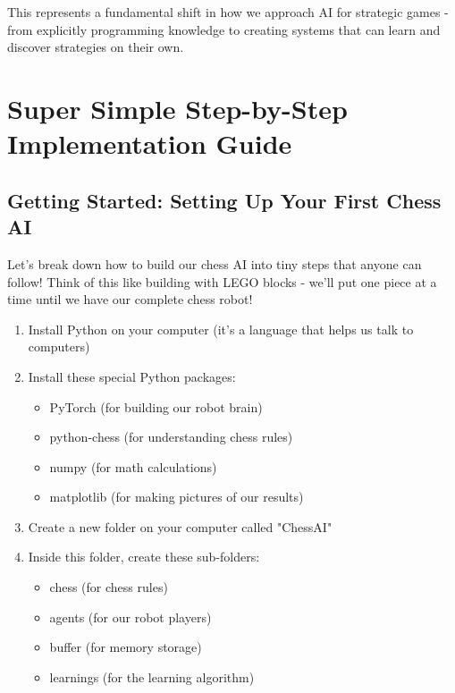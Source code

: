\documentclass[11pt]{article}
\begin{document}
This represents a fundamental shift in how we approach AI for strategic games - from explicitly programming knowledge to creating systems that can learn and discover strategies on their own.

\section{Super Simple Step-by-Step Implementation Guide}

\subsection{Getting Started: Setting Up Your First Chess AI}

Let's break down how to build our chess AI into tiny steps that anyone can follow! Think of this like building with LEGO blocks - we'll put one piece at a time until we have our complete chess robot!

\begin{tcolorbox}[colback=blue!5!white,colframe=blue!75!black,title=Computer Setup Steps]
\begin{enumerate}
    \item Install Python on your computer (it's a language that helps us talk to computers)
    \item Install these special Python packages:
    \begin{itemize}
        \item PyTorch (for building our robot brain)
        \item python-chess (for understanding chess rules)
        \item numpy (for math calculations)
        \item matplotlib (for making pictures of our results)
    \end{itemize}
    \item Create a new folder on your computer called "ChessAI"
    \item Inside this folder, create these sub-folders:
    \begin{itemize}
        \item chess (for chess rules)
        \item agents (for our robot players)
        \item buffer (for memory storage)
        \item learnings (for the learning algorithm)
    \end{itemize}
\end{enumerate}
\end{tcolorbox}
\end{document}
